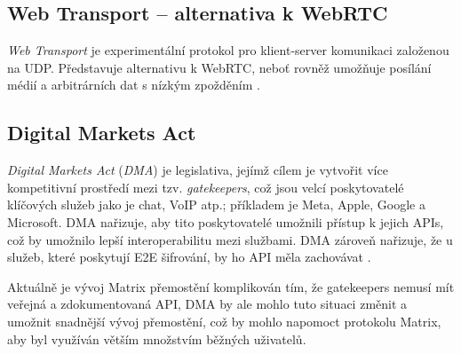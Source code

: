 \subsection{Web Transport -- alternativa k WebRTC}

\textit{Web Transport} je experimentální protokol pro klient-server komunikaci
založenou na UDP. Představuje alternativu k WebRTC, neboť rovněž umožňuje
posílání médií a arbitrárních dat s nízkým zpožděním \cite{GitHub-WebTransport-Explainer}.

\subsection{Digital Markets Act}

\textit{Digital Markets Act} (\textit{DMA}) je legislativa, jejímž cílem je
vytvořit více kompetitivní prostředí mezi tzv. \textit{gatekeepers}, což jsou
velcí poskytovatelé klíčových služeb jako je chat, VoIP atp.; příkladem je Meta,
Apple, Google a Microsoft. DMA nařizuje, aby tito poskytovatelé umožnili přístup
k jejich APIs, což by umožnilo lepší interoperabilitu mezi službami. DMA zároveň
nařizuje, že u služeb, které poskytují E2E šifrování, by ho API měla zachovávat
\cite{Element-AGuideToNavigateTheDMA}.

Aktuálně je vývoj Matrix přemostění komplikován tím, že gatekeepers nemusí mít
veřejná a zdokumentovaná API, DMA by ale mohlo tuto situaci změnit a umožnit
snadnější vývoj přemostění, což by mohlo napomoct protokolu Matrix, aby byl
využíván větším množstvím běžných uživatelů.
